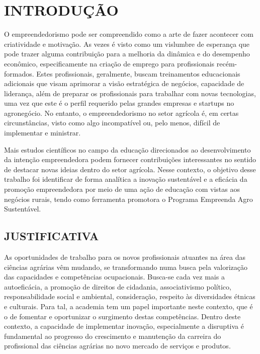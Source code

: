 \chapter{INTRODUÇÃO}

O empreendedorismo  pode ser compreendido como a arte de fazer acontecer com criatividade e motivação. As vezes é visto como um vislumbre de esperança que pode trazer alguma contribuição para a melhoria da dinâmica e do desempenho econômico, especificamente na criação de emprego para profissionais recém-formados. Estes profissionais, geralmente, buscam treinamentos educacionais adicionais que visam aprimorar a visão estratégica de negócios, capacidade de liderança, além de preparar os profissionais para trabalhar com novas tecnologias, uma vez que este é o perfil requerido pelas grandes empresas e startups no agronegócio. No entanto, o empreendedorismo no setor agrícola é, em certas circunstâncias, visto como algo incompatível ou, pelo menos, difícil de implementar e ministrar.

Mais estudos científicos no campo da educação direcionados ao desenvolvimento da intenção empreendedora podem fornecer contribuições interessantes no sentido de destacar novas ideias dentro do setor agrícola. Nesse contexto, o objetivo desse trabalho foi identificar de forma analítica a inovação sustentável e a eficácia da promoção empreendedora por meio de uma ação de educação com vistas aos negócios rurais, tendo como ferramenta promotora o Programa Empreenda Agro Sustentável.



\section{JUSTIFICATIVA}

As oportunidades de trabalho para os novos profissionais atuantes na área das ciências agrárias vêm mudando, se transformando numa busca pela valorização das capacidades e competências ocupacionais. Busca-se cada vez mais a autoeficácia, a promoção de direitos de cidadania, associativismo político, responsabilidade social e ambiental, consideração, respeito às diversidades étnicas e culturais. Para tal, a academia tem um papel importante neste contexto, que é o de fomentar e oportunizar o surgimento destas competências. Dentro deste contexto, a capacidade de implementar inovação, especialmente a disruptiva é fundamental ao progresso do crescimento e manutenção da carreira do profissional das ciências agrárias no novo mercado de serviços e produtos. 


